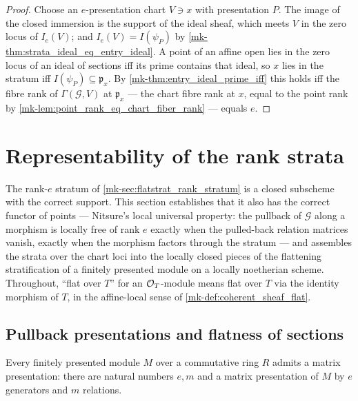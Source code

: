 \begin{proof}
  \leanok
  Choose an \(e\)-presentation chart \(V \ni x\) with presentation \(P\).  The
  image of the closed immersion is the support of the ideal sheaf, which meets
  \(V\) in the zero locus of \(I_e(V)\); and \(I_e(V) = I(\psi_P)\) by
  \ref{mk-thm:strata_ideal_eq_entry_ideal}.  A point of an affine open lies in
  the zero locus of an ideal of sections iff its prime contains that ideal, so
  \(x\) lies in the stratum iff \(I(\psi_P) \subseteq \mathfrak p_x\).  By
  \ref{mk-thm:entry_ideal_prime_iff} this holds iff the fibre rank of
  \(\Gamma(\mathcal G, V)\) at \(\mathfrak p_x\) --- the chart fibre rank at
  \(x\), equal to the point rank by
  \ref{mk-lem:point_rank_eq_chart_fiber_rank} --- equals \(e\).
\end{proof}

\section{Representability of the rank strata}
\label{mk-sec:flatstrat_representability}

The rank-\(e\) stratum of \ref{mk-sec:flatstrat_rank_stratum} is a closed
subscheme with the correct support.  This section establishes that it also
has the correct functor of points --- Nitsure's local universal property:
the pullback of \(\mathcal G\) along a morphism is locally free of rank
\(e\) exactly when the pulled-back relation matrices vanish, exactly when
the morphism factors through the stratum --- and assembles the strata over
the chart loci into the locally closed pieces of the flattening
stratification of a finitely presented module on a locally noetherian
scheme.  Throughout, ``flat over \(T\)'' for an \(\mathcal{O}_T\)-module means flat
over \(T\) via the identity morphism of \(T\), in the affine-local sense of
\ref{mk-def:coherent_sheaf_flat}.

\subsection{Pullback presentations and flatness of sections}

\begin{lemma}
  \label{mk-lem:exists_matrix_presentation}
  \leanok

  Every finitely presented module \(M\) over a commutative ring \(R\) admits
  a matrix presentation: there are natural numbers \(e, m\) and a matrix
  presentation of \(M\) by \(e\) generators and \(m\) relations.
\end{lemma}


